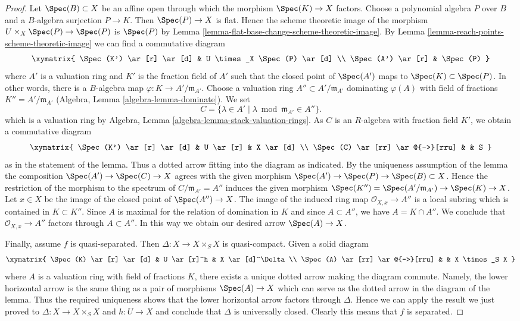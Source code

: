 \begin{proof}
\medskip\noindent
Let $\Spec(B) \subset X$ be an affine open through which
the morphism $\Spec(K) \to X$ factors. Choose a polynomial
algebra $P$ over $B$ and a $B$-algebra surjection $P \to K$.
Then $\Spec(P) \to X$ is flat. Hence the scheme theoretic image
of the morphism $U \times_X \Spec(P) \to \Spec(P)$ is $\Spec(P)$ by
Lemma \ref{lemma-flat-base-change-scheme-theoretic-image}.
By Lemma \ref{lemma-reach-points-scheme-theoretic-image}
we can find a commutative diagram
$$
\xymatrix{
\Spec(K') \ar[r] \ar[d] & U \times_X \Spec(P) \ar[d] \\
\Spec(A') \ar[r] & \Spec(P)
}
$$
where $A'$ is a valuation ring and $K'$ is the fraction field of $A'$
such that the closed point of $\Spec(A')$ maps to $\Spec(K) \subset \Spec(P)$.
In other words, there is a $B$-algebra map
$\varphi : K \to A'/\mathfrak m_{A'}$. Choose a valuation ring
$A'' \subset A'/\mathfrak m_{A'}$ dominating $\varphi(A)$ with
field of fractions $K'' = A'/\mathfrak m_{A'}$
(Algebra, Lemma \ref{algebra-lemma-dominate}). We set
$$
C = \{\lambda \in A' \mid \lambda \bmod \mathfrak m_{A'} \in A''\}.
$$
which is a valuation ring by
Algebra, Lemma \ref{algebra-lemma-stack-valuation-rings}.
As $C$ is an $R$-algebra with fraction field $K'$, we obtain a
commutative diagram
$$
\xymatrix{
\Spec(K') \ar[r] \ar[d] & U \ar[r] & X \ar[d] \\
\Spec(C) \ar[rr] \ar@{-->}[rru] & & S
}
$$
as in the statement of the lemma. Thus a dotted arrow fitting into
the diagram as indicated. By the uniqueness assumption of the lemma
the composition $\Spec(A') \to \Spec(C) \to X$ agrees with the
given morphism $\Spec(A') \to \Spec(P) \to \Spec(B) \subset X$.
Hence the restriction of the morphism to the spectrum of
$C/\mathfrak m_{A'} = A''$ induces the given morphism
$\Spec(K'') = \Spec(A'/\mathfrak m_{A'}) \to \Spec(K) \to X$.
Let $x \in X$ be the image of the closed point of $\Spec(A'') \to X$.
The image of the induced ring map $\mathcal{O}_{X, x} \to A''$
is a local subring which is contained in $K \subset K''$.
Since $A$ is maximal for the relation of domination in $K$
and since $A \subset A''$, we have $A = K \cap A''$. We conclude
that $\mathcal{O}_{X, x} \to A''$ factors through $A \subset A''$.
In this way we obtain our desired arrow $\Spec(A) \to X$.

\medskip\noindent
Finally, assume $f$ is quasi-separated. Then $\Delta : X \to X \times_S X$
is quasi-compact. Given a solid diagram
$$
\xymatrix{
\Spec(K) \ar[r] \ar[d] & U \ar[r]^h & X \ar[d]^\Delta \\
\Spec(A) \ar[rr] \ar@{-->}[rru] & & X \times_S X
}
$$
where $A$ is a valuation ring with field of fractions $K$, there
exists a unique dotted arrow making the diagram commute. Namely,
the lower horizontal arrow is the same thing as a pair of morphisms
$\Spec(A) \to X$ which can serve as the dotted arrow in the diagram
of the lemma. Thus the required uniqueness shows that the lower
horizontal arrow factors through $\Delta$.
Hence we can apply the result we just proved to
$\Delta : X \to X \times_S X$ and $h : U \to X$ and conclude that
$\Delta$ is universally closed. Clearly this means that $f$
is separated.
\end{proof}

